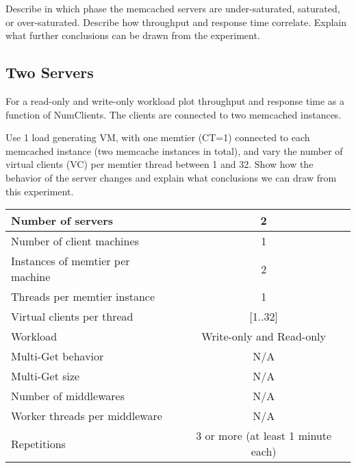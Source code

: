 \documentclass[11pt,a4paper]{article}
\begin{document}
Describe in which phase the memcached servers are under-saturated, saturated, or over-saturated. Describe how throughput and response time correlate. Explain what further conclusions can be drawn from the experiment.


\subsection{Two Servers}

For a read-only and write-only workload plot throughput and response time as a function of NumClients. The clients are connected to two memcached instances. 

Use 1 load generating VM, with one memtier (CT=1) connected to each memcached instance (two memcache instances in total), and vary the number of virtual clients (VC) per memtier thread between 1 and 32. Show how the behavior of the server changes and explain what conclusions we can draw from this experiment.

\begin{center}
	\scriptsize{
		\begin{tabular}{|l|c|}
			\hline Number of servers                & 2                        \\ 
			\hline Number of client machines        & 1                        \\ 
			\hline Instances of memtier per machine & 2                        \\ 
			\hline Threads per memtier instance     & 1                        \\
			\hline Virtual clients per thread       & [1..32]                  \\ 
			\hline Workload                         & Write-only and Read-only \\
			\hline Multi-Get behavior               & N/A                      \\
			\hline Multi-Get size                   & N/A                      \\
			\hline Number of middlewares            & N/A                      \\
			\hline Worker threads per middleware    & N/A                      \\
			\hline Repetitions                      & 3 or more (at least 1 minute each)                \\ 
			\hline 
		\end{tabular}
	} 
\end{center}
\end{document}
